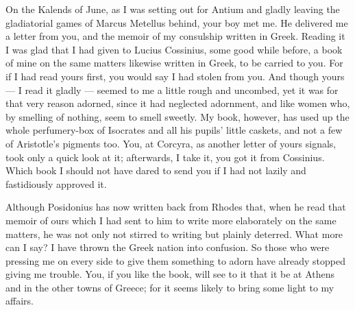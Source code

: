 

 On the Kalends of June, as I was setting out for Antium and gladly leaving the gladiatorial games of Marcus Metellus behind, your boy met me. He delivered me a letter from you, and the memoir of my consulship written in Greek. Reading it I was glad that I had given to Lucius Cossinius, some good while before, a book of mine on the same matters likewise written in Greek, to be carried to you. For if I had read yours first, you would say I had stolen from you. And though yours --- I read it gladly --- seemed to me a little rough and uncombed, yet it was for that very reason adorned, since it had neglected adornment, and like women who, by smelling of nothing, seem to smell sweetly. My book, however, has used up the whole perfumery-box of Isocrates and all his pupils' little caskets, and not a few of Aristotle's pigments too. You, at Corcyra, as another letter of yours signals, took only a quick look at it; afterwards, I take it, you got it from Cossinius. Which book I should not have dared to send you if I had not lazily and fastidiously approved it.

 Although Posidonius has now written back from Rhodes that, when he read that memoir of ours which I had sent to him to write more elaborately on the same matters, he was not only not stirred to writing but plainly deterred. What more can I say? I have thrown the Greek nation into confusion. So those who were pressing me on every side to give them something to adorn have already stopped giving me trouble. You, if you like the book, will see to it that it be at Athens and in the other towns of Greece; for it seems likely to bring some light to my affairs.

